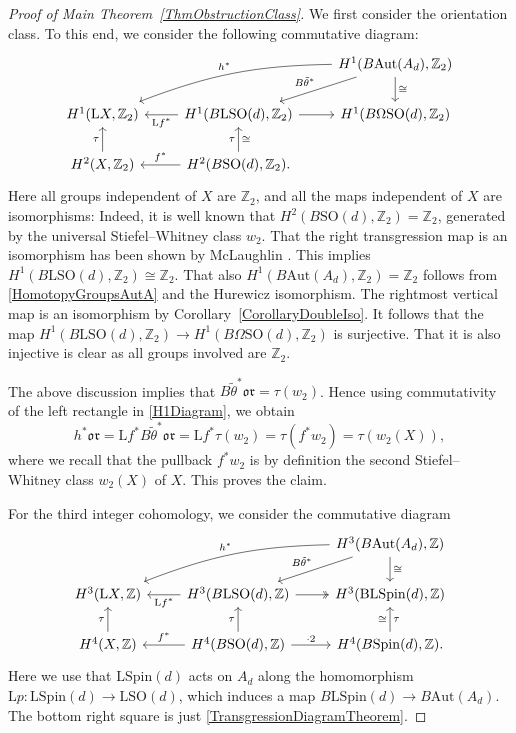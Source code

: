 \documentclass[11pt]{article}
\numberwithin{equation}{section}
\numberwithin{equation}{section}
\newcommand{\Z}{\mathbb{Z}}
\newcommand{\B}{\mathrm{B}}
\newcommand{\SO}{\mathrm{SO}}
\newcommand{\Aut}{\mathrm{Aut}}
\newcommand{\Spin}{\mathrm{Spin}}
\renewcommand{\L}{\mathrm{L}}
\newcommand{\oclass}{\mathfrak{or}}
\begin{document}
\begin{proof}[Proof of Main Theorem~\ref{ThmObstructionClass}]
We first consider the orientation class.
To this end, we consider the following commutative diagram:
\begin{equation} \label{H1Diagram}
\begin{tikzcd}
 & & H^{1}(B\Aut(A_d), \Z_2) \ar[dl, "B\tilde{\theta}^*"'] \ar[d, "\cong"] \ar[dll, "h^*"', bend right=10]\\
 H^{1}(\L X, \Z_2) & \ar[l, "\L f^*"] H^{1}(B\L \SO(d), \Z_2) \ar[r] & H^{1}(B\Omega\SO(d), \Z_2) \\
 H^2(X, \Z_2) \ar[u, "\tau"] & \ar[l, "f^*"'] H^2(B\SO(d), \Z_2) \ar[u, "\tau", "\cong"'].
\end{tikzcd}
\end{equation}
Here all groups independent of $X$ are $\Z_2$, and all the maps independent of $X$ are isomorphisms:
Indeed, it is well known that $H^2(B\SO(d), \Z_2) = \Z_2$, generated by the universal Stiefel--Whitney class $w_2$.
That the right transgression map is an isomorphism has been shown by McLaughlin \cite[proof of Proposition~2.1]{McLaughlin}. This implies $H^{1}(B\L \SO(d), \Z_2) \cong \Z_2$.
That also ${H^1(B\Aut(A_d), \Z_2) = \Z_2}$ follows from \eqref{HomotopyGroupsAutA} and the Hurewicz isomorphism.
The rightmost vertical map is an isomorphism by Corollary~\ref{CorollaryDoubleIso}.
It follows that the map $H^{1}(B\L \SO(d), \Z_2) \to H^{1}(B\Omega\SO(d), \Z_2)$ is surjective.
That it is also injective is clear as all groups involved are $\Z_2$.

The above discussion implies that $B\tilde{\theta}^* \oclass = \tau(w_2)$.
Hence using commutativity of the left rectangle in \eqref{H1Diagram}, we obtain
\begin{equation*}
 h^* \oclass = \L f^*B\tilde{\theta}^*\oclass = \L f^* \tau(w_2) = \tau(f^*w_2) = \tau(w_2(X)),
\end{equation*}
where we recall that the pullback $f^*w_2$ is by definition the second Stiefel--Whitney class $w_2(X)$ of $X$.
This proves the claim.

For the third integer cohomology, we consider the commutative diagram
\begin{equation} \label{H3Diagram}
\begin{tikzcd}
 & & H^{3}(B\Aut(A_d), \Z) \ar[dl, "B\tilde{\theta}^*"'] \ar[dll, "h^*"', bend right = 10] \ar[d, "\cong"] \\
 H^{3}(\L X, \Z) & \ar[l, "\L f^*"] H^{3}(B\L \SO(d), \Z) \ar[r, two heads] & H^{3}(\B\L\Spin(d), \Z) \\
 H^4(X, \Z) \ar[u, "\tau"] & \ar[l, "f^*"'] H^4(B\SO(d), \Z) \ar[u, "\tau"] \ar[r, "\cdot 2"] & H^4(B \Spin(d), \Z). \ar[u, "\tau"', "\cong"]
\end{tikzcd}
\end{equation}
Here we use that $\L\Spin(d)$ acts on $A_d$ along the homomorphism $\L p\colon \L\Spin(d) \to \L\SO(d)$, which induces a map $B\L\Spin(d) \to B\Aut(A_d)$.
The bottom right square is just \eqref{TransgressionDiagramTheorem}.


\end{proof}
\end{document}
